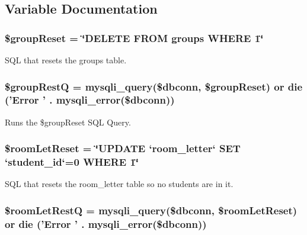 \subsection{\-Variable \-Documentation}
\hypertarget{autoReset_8php_a196911b75d870334239968cfe0faccea}{
\subsubsection[{\$group\-Reset}]{\setlength{\rightskip}{0pt plus 5cm}\$group\-Reset = \char`\"{}\-D\-E\-L\-E\-T\-E \-F\-R\-O\-M groups \-W\-H\-E\-R\-E 1\char`\"{}}}\label{autoReset_8php_a196911b75d870334239968cfe0faccea}
\-S\-Q\-L that resets the groups table. \hypertarget{autoReset_8php_a569059e4fb7abd35a8b0573e74b8c8cf}{
\subsubsection[{\$group\-Rest\-Q}]{\setlength{\rightskip}{0pt plus 5cm}\$group\-Rest\-Q = mysqli\-\_\-query(\$dbconn, \$group\-Reset) or die ('\-Error ' . mysqli\-\_\-error(\$dbconn))}}\label{autoReset_8php_a569059e4fb7abd35a8b0573e74b8c8cf}
\-Runs the \$group\-Reset \-S\-Q\-L \-Query. \hypertarget{autoReset_8php_abdc52362179d3c8ff144e8da3468d399}{
\subsubsection[{\$room\-Let\-Reset}]{\setlength{\rightskip}{0pt plus 5cm}\$room\-Let\-Reset = \char`\"{}\-U\-P\-D\-A\-T\-E `room\-\_\-letter` \-S\-E\-T `student\-\_\-id`=0 \-W\-H\-E\-R\-E 1\char`\"{}}}\label{autoReset_8php_abdc52362179d3c8ff144e8da3468d399}
\-S\-Q\-L that resets the room\-\_\-letter table so no students are in it. \hypertarget{autoReset_8php_a97de145c656e04df0e5900451d77e099}{
\subsubsection[{\$room\-Let\-Rest\-Q}]{\setlength{\rightskip}{0pt plus 5cm}\$room\-Let\-Rest\-Q = mysqli\-\_\-query(\$dbconn, \$room\-Let\-Reset) or die ('\-Error ' . mysqli\-\_\-error(\$dbconn))}}\label{autoReset_8php_a97de145c656e04df0e5900451d77e099}

